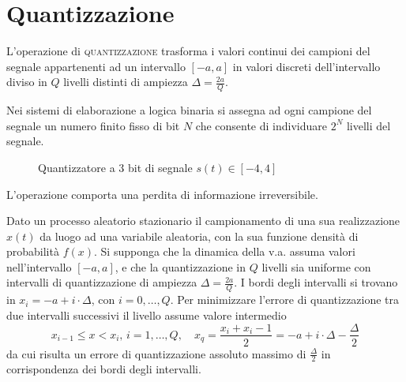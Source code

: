 \section{Quantizzazione}
L'operazione di \textsc{quantizzazione} trasforma i valori continui dei campioni del segnale appartenenti ad un intervallo $[-a,a]$ in valori discreti  dell'intervallo diviso in $Q$ livelli distinti di ampiezza $\Delta=\frac{2a}{Q}$.

Nei sistemi di elaborazione a logica binaria si assegna ad ogni campione del segnale un numero finito fisso di bit $N$ che consente di individuare $2^N$ livelli del segnale.

\begin{figure}[!h]
\centering
{}
\caption{Quantizzatore a 3 bit di segnale $s(t)\in[-4,4]$}
\end{figure}

L'operazione comporta una perdita di informazione irreversibile.

Dato un processo aleatorio stazionario il campionamento di una sua realizzazione $x(t)$ da luogo ad una variabile aleatoria, con la sua funzione densità di probabilità $f(x)$. Si supponga che la dinamica della v.a. assuma valori nell'intervallo $[-a,a]$, e che la quantizzazione in $Q$ livelli sia uniforme con intervalli di quantizzazione di ampiezza $\Delta=\frac{2a}{Q}$. I bordi degli intervalli si trovano in $x_i=-a+i\cdot\Delta$, con $i=0,\dots,Q$.  Per minimizzare l'errore di quantizzazione tra due intervalli successivi il livello assume valore intermedio
\begin{equation}
	x_{i-1}\leq x<x_i,\,i=1,\dots,Q,\quad x_q=\frac{x_i+x_i-1}{2}=-a+i\cdot\Delta-\frac{\Delta}{2}
\end{equation}
da cui risulta un errore di quantizzazione assoluto massimo di $\frac{\Delta}{2}$ in corrispondenza dei bordi degli intervalli.

